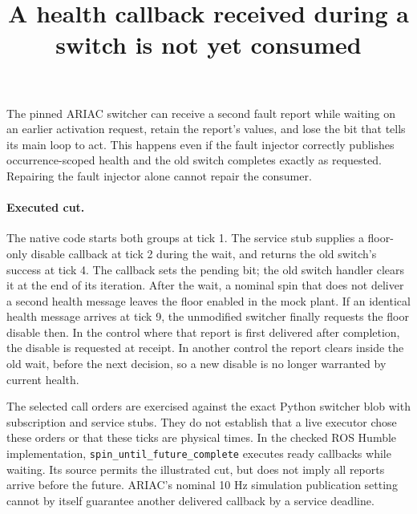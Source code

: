 \documentclass{article}
\title{A health callback received during a switch is not yet consumed}
\begin{document}
\maketitle
The pinned ARIAC switcher can receive a second fault report while
waiting on an earlier activation request, retain the report's values,
and lose the bit that tells its main loop to act. This happens even
if the fault injector correctly publishes occurrence-scoped health
and the old switch completes exactly as requested. Repairing the
fault injector alone cannot repair the consumer.

\paragraph{Executed cut.}
The native code starts both groups at tick 1. The service stub supplies
a floor-only disable callback at tick 2 during the wait, and returns the
old switch's success at tick 4. The callback sets the pending bit; the
old switch handler clears it at the end of its iteration. After the
wait, a nominal spin that does not deliver a second health message
leaves the floor enabled in the mock plant. If an identical health
message arrives at tick 9, the unmodified switcher finally requests
the floor disable then. In the control where that report is first
delivered after completion, the disable is requested at receipt.
In another control the report clears inside the old wait, before the
next decision, so a new disable is no longer warranted by current health.

The selected call orders are exercised against the exact Python
switcher blob with subscription and service stubs. They do not
establish that a live executor chose these orders or that these
ticks are physical times. In the checked ROS Humble implementation,
\texttt{spin\_until\_future\_complete} executes ready callbacks while
waiting. Its source permits the illustrated cut, but does not imply
all reports arrive before the future. ARIAC's nominal 10 Hz simulation
publication setting cannot by itself guarantee another delivered
callback by a service deadline.
\end{document}
